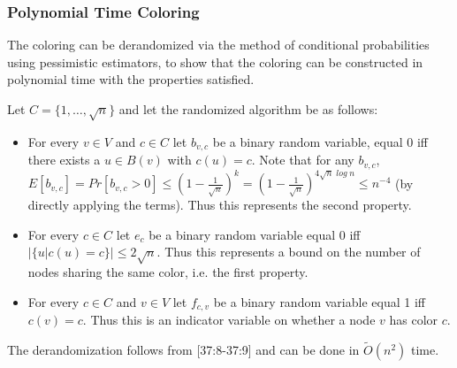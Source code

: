 \subsubsection{Polynomial Time Coloring}
The coloring can be derandomized via the method of conditional probabilities
using pessimistic estimators, to show that the coloring can be constructed in
polynomial time with the properties satisfied.

Let $C = \{ 1,\dots,\sqrt{n}\}$ and let the randomized algorithm be as
follows:
\begin{itemize}
    \item For every $v \in V$ and $c \in C$ let $b_{v,c}$ be a binary
        random variable, equal 0 iff there exists a $u \in B(v)$ with
        $c(u) = c$. Note that for any $b_{v,c}$, $E[b_{v,c}] = Pr[b_{v,c}
        > 0] \leq (1 - \frac{1}{\sqrt{n}})^k = (1 - \frac{1}{\sqrt{n}})^{4
        \sqrt{n}\;log\;n} \leq n^{-4}$ (by directly applying the terms). Thus
        this represents the second property.
    \item For every $c\in C$ let $e_c$ be a binary random variable equal 0 iff
        $|\{u| c(u) = c\}| \leq 2\sqrt{n}$. Thus this represents a bound on
        the number of nodes sharing the same color, i.e. the first property.
    \item For every $c\in C$ and $v\in V$ let $f_{c,v}$ be a binary random
        variable equal 1 iff $c(v) = c$. Thus this is an indicator variable on
        whether a node $v$ has color $c$.
\end{itemize}

The derandomization follows from \cite{compactNameIndepRouting}[37:8-37:9] and
can be done in $\tilde{O}(n^2)$ time.




